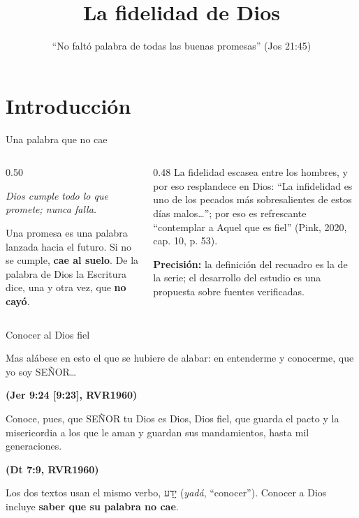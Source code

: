 \documentclass[hyperref={bookmarks=false},aspectratio=169]{beamer}
\title[La fidelidad]{\bfseries{La fidelidad de Dios}}
\subtitle{``No faltó palabra de todas las buenas promesas'' (Jos 21:45)}
\author{}\institute{}\date{}
\newcommand{\heb}[1]{\mbox{\foreignlanguage{hebrew}{#1}}}
\newcommand{\SENOR}{S{\fontsize{0.78em}{1em}\selectfont EÑOR}}
\newcommand{\fuente}[1]{\par\hfill{\upshape\bfseries\footnotesize\textcolor{azul}{#1}}}
\newcommand{\destacar}[1]{\textbf{\textcolor{azul}{#1}}}
\newcommand{\precision}[1]{{\footnotesize\color{gris}\textbf{Precisión:} #1}}
\begin{document}
\frame{\titlepage}


\section{Introducción}

\begin{frame}{Una palabra que no cae}
\begin{columns}[c,onlytextwidth]
\begin{column}{0.50\textwidth}
\begin{tcolorbox}[colback=papiro,colframe=dorado,boxrule=1.2pt,arc=3pt]
\centering\large\itshape Dios cumple todo lo que promete; nunca falla.
\end{tcolorbox}
\small\RaggedRight Una promesa es una palabra lanzada hacia el futuro. Si no se cumple, \destacar{cae al suelo}. De la palabra de Dios la Escritura dice, una y otra vez, que \destacar{no cayó}.
\end{column}
\begin{column}{0.48\textwidth}
\scriptsize
\small La fidelidad escasea entre los hombres, y por eso resplandece en Dios: ``La infidelidad es uno de los pecados más sobresalientes de estos días malos\ldots{}''; por eso es refrescante ``contemplar a Aquel que es fiel'' (Pink, 2020, cap. 10, p. 53).\par\medskip\scriptsize
\precision{la definición del recuadro es la de la serie; el desarrollo del estudio es una propuesta sobre fuentes verificadas.}
\end{column}
\end{columns}
\end{frame}

\begin{frame}{Conocer al Dios fiel}
\begin{cita}Mas alábese en esto el que se hubiere de alabar: en entenderme y conocerme, que yo soy \SENOR{}\ldots\fuente{(Jer 9:24 [9:23], RVR1960)}\end{cita}
\begin{cita}Conoce, pues, que \SENOR{} tu Dios es Dios, Dios fiel, que guarda el pacto y la misericordia a los que le aman y guardan sus mandamientos, hasta mil generaciones.\fuente{(Dt 7:9, RVR1960)}\end{cita}
\small Los dos textos usan el mismo verbo, \heb{יָדַע} (\emph{yadá}, ``conocer''). Conocer a Dios incluye \destacar{saber que su palabra no cae}.\par\medskip
\centering
{}
\end{frame}
\end{document}
